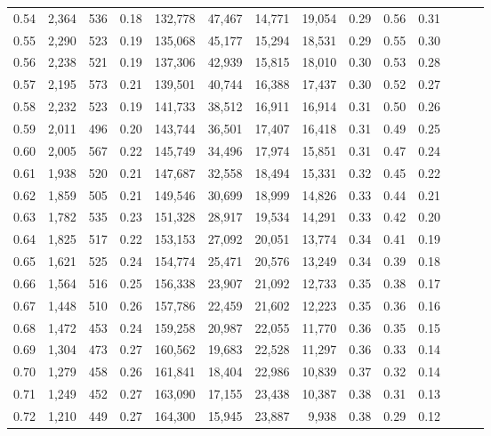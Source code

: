 \begin{tabular}{rrrrrrrrrrrrrr}
0.54 &  2,364 &  536 &  0.18 &  132,778 &   47,467 &  14,771 &  19,054 &  0.29 &  0.56 &      0.31 \\
0.55 &  2,290 &  523 &  0.19 &  135,068 &   45,177 &  15,294 &  18,531 &  0.29 &  0.55 &      0.30 \\
0.56 &  2,238 &  521 &  0.19 &  137,306 &   42,939 &  15,815 &  18,010 &  0.30 &  0.53 &      0.28 \\
0.57 &  2,195 &  573 &  0.21 &  139,501 &   40,744 &  16,388 &  17,437 &  0.30 &  0.52 &      0.27 \\
0.58 &  2,232 &  523 &  0.19 &  141,733 &   38,512 &  16,911 &  16,914 &  0.31 &  0.50 &      0.26 \\
0.59 &  2,011 &  496 &  0.20 &  143,744 &   36,501 &  17,407 &  16,418 &  0.31 &  0.49 &      0.25 \\
0.60 &  2,005 &  567 &  0.22 &  145,749 &   34,496 &  17,974 &  15,851 &  0.31 &  0.47 &      0.24 \\
0.61 &  1,938 &  520 &  0.21 &  147,687 &   32,558 &  18,494 &  15,331 &  0.32 &  0.45 &      0.22 \\
0.62 &  1,859 &  505 &  0.21 &  149,546 &   30,699 &  18,999 &  14,826 &  0.33 &  0.44 &      0.21 \\
0.63 &  1,782 &  535 &  0.23 &  151,328 &   28,917 &  19,534 &  14,291 &  0.33 &  0.42 &      0.20 \\
0.64 &  1,825 &  517 &  0.22 &  153,153 &   27,092 &  20,051 &  13,774 &  0.34 &  0.41 &      0.19 \\
0.65 &  1,621 &  525 &  0.24 &  154,774 &   25,471 &  20,576 &  13,249 &  0.34 &  0.39 &      0.18 \\
0.66 &  1,564 &  516 &  0.25 &  156,338 &   23,907 &  21,092 &  12,733 &  0.35 &  0.38 &      0.17 \\
0.67 &  1,448 &  510 &  0.26 &  157,786 &   22,459 &  21,602 &  12,223 &  0.35 &  0.36 &      0.16 \\
0.68 &  1,472 &  453 &  0.24 &  159,258 &   20,987 &  22,055 &  11,770 &  0.36 &  0.35 &      0.15 \\
0.69 &  1,304 &  473 &  0.27 &  160,562 &   19,683 &  22,528 &  11,297 &  0.36 &  0.33 &      0.14 \\
0.70 &  1,279 &  458 &  0.26 &  161,841 &   18,404 &  22,986 &  10,839 &  0.37 &  0.32 &      0.14 \\
0.71 &  1,249 &  452 &  0.27 &  163,090 &   17,155 &  23,438 &  10,387 &  0.38 &  0.31 &      0.13 \\
0.72 &  1,210 &  449 &  0.27 &  164,300 &   15,945 &  23,887 &   9,938 &  0.38 &  0.29 &      0.12 \\

\end{tabular}
